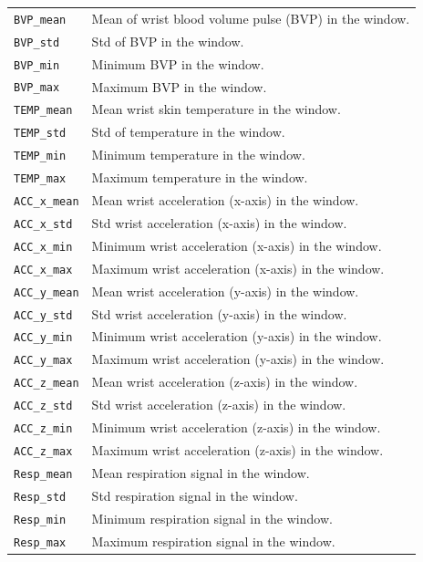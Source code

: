 \documentclass[11pt]{article}
\begin{document}
\begin{longtable}{@{}p{}p{}@{}}
\texttt{BVP\_mean} & Mean of wrist blood volume pulse (BVP) in the window. \\
\texttt{BVP\_std} & Std of BVP in the window. \\
\texttt{BVP\_min} & Minimum BVP in the window. \\
\texttt{BVP\_max} & Maximum BVP in the window. \\

\texttt{TEMP\_mean} & Mean wrist skin temperature in the window. \\
\texttt{TEMP\_std} & Std of temperature in the window. \\
\texttt{TEMP\_min} & Minimum temperature in the window. \\
\texttt{TEMP\_max} & Maximum temperature in the window. \\

\texttt{ACC\_x\_mean} & Mean wrist acceleration (x-axis) in the window. \\
\texttt{ACC\_x\_std} & Std wrist acceleration (x-axis) in the window. \\
\texttt{ACC\_x\_min} & Minimum wrist acceleration (x-axis) in the window. \\
\texttt{ACC\_x\_max} & Maximum wrist acceleration (x-axis) in the window. \\

\texttt{ACC\_y\_mean} & Mean wrist acceleration (y-axis) in the window. \\
\texttt{ACC\_y\_std} & Std wrist acceleration (y-axis) in the window. \\
\texttt{ACC\_y\_min} & Minimum wrist acceleration (y-axis) in the window. \\
\texttt{ACC\_y\_max} & Maximum wrist acceleration (y-axis) in the window. \\

\texttt{ACC\_z\_mean} & Mean wrist acceleration (z-axis) in the window. \\
\texttt{ACC\_z\_std} & Std wrist acceleration (z-axis) in the window. \\
\texttt{ACC\_z\_min} & Minimum wrist acceleration (z-axis) in the window. \\
\texttt{ACC\_z\_max} & Maximum wrist acceleration (z-axis) in the window. \\

\texttt{Resp\_mean} & Mean respiration signal in the window. \\
\texttt{Resp\_std} & Std respiration signal in the window. \\
\texttt{Resp\_min} & Minimum respiration signal in the window. \\
\texttt{Resp\_max} & Maximum respiration signal in the window. \\


\end{longtable}
\end{document}
